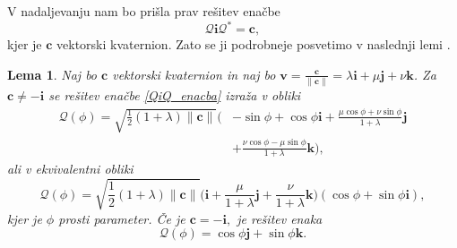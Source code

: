\documentclass[12pt,a4paper,twoside]{article}
\theoremstyle{definition} %
\theoremstyle{plain} %
\newtheorem{lema}[definicija]{Lema}
\theoremstyle{primerstyle}
\numberwithin{equation}{section}  %
\newcommand{\cV}{\mathbf{c}}
\newcommand{\iV}{\mathbf{i}}
\newcommand{\jV}{\mathbf{j}}
\newcommand{\kV}{\mathbf{k}}
\newcommand{\vV}{\mathbf{v}}
\newcommand{\QQ}{\mathcal{Q}}
\begin{document}
V nadaljevanju nam bo prišla prav rešitev enačbe
\begin{equation}
	\label{QiQ_enacba}
	\QQ\iV\QQ^*=\cV,
\end{equation}
kjer je $\cV$ vektorski kvaternion. Zato se ji podrobneje posvetimo v naslednji lemi \cite[poglavje 3.2]{farouki2002hermite}.
\begin{lema}
	\label{QiQ_enacba_lema}
	Naj bo $\cV$ vektorski kvaternion in naj bo $\vV=\frac{\cV}{\lVert\cV\rVert}=\lambda\iV+\mu\jV+\nu\kV$. Za $\cV\neq-\iV$ se rešitev enačbe \eqref{QiQ_enacba} izraža v obliki
	\begin{align}
		\QQ(\phi)=\sqrt{\frac{1}{2}(1+\lambda)\lVert\cV\rVert}\Big(&-\sin\phi+\cos\phi\iV+\frac{\mu\cos\phi+\nu\sin\phi}{1+\lambda}\jV\nonumber\\
		&+\frac{\nu\cos\phi-\mu\sin\phi}{1+\lambda}\kV\Big),\label{QiQ_enacba_resitev}
	\end{align}
	ali v ekvivalentni obliki
	\begin{equation}
		\label{QiQ_enacba_resitev2}
		\QQ(\phi)=\sqrt{\frac{1}{2}(1+\lambda)\lVert\cV\rVert}\Big(\iV+\frac{\mu}{1+\lambda}\jV+\frac{\nu}{1+\lambda}\kV\Big)(\cos\phi+\sin\phi\iV),
	\end{equation}
	kjer je $\phi$ prosti parameter. Če je $\cV=-\iV,$ je rešitev enaka
	\begin{equation}
		\label{QiQ_enacba_resitev3}
		\QQ(\phi)=\cos\phi\jV+\sin\phi\kV.
	\end{equation}
\end{lema}
\end{document}
